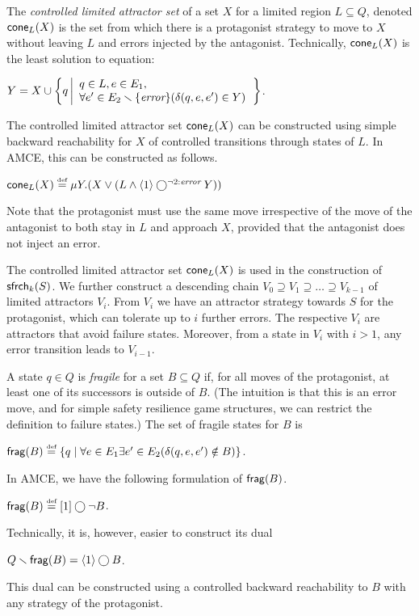 The \emph{controlled limited attractor set} of a set $X$ for a
limited region $L\subseteq Q$, denoted $\mathsf{cone}_L(X)$ is the set 
from which there is a protagonist strategy to move to $X$ without leaving $L$ 
and errors injected by the antagonist.  
Technically, $\mathsf{cone}_L(X)$ is the least solution to 
equation:\label{reply2.cla} 
\begin{center} 
$Y = X\cup\left\{q\left| \begin{array}{l} 
q\in L,e\in E_1,\\
\forall e'\in E_2\smallsetminus \{\textit{error}\}( \delta(q,e,e')\in Y)
\end{array}\right.\right\}$.   
\end{center} 
The controlled limited attractor set 
$\mathsf{cone}_L(X)$ can be constructed using simple backward reachability 
for $X$ of controlled transitions through states of $L$.  
In AMCE, this can be constructed as follows. 
\begin{center} 
\label{reply2.cla.alg}
$\mathsf{cone}_L(X)\stackrel{\mbox{\tiny def}}{=} \mu Y. (X\vee(L\wedge \langle 1\rangle \bigcirc^{\neg 2:\textit{\scriptsize error}} Y))$
\end{center} 
Note that the protagonist must use the same move irrespective 
of the move of the antagonist to both stay in $L$ and approach $X$, 
provided that the antagonist does not inject an error.




The controlled limited attractor set\label{reply2.limit.attractor} 
$\mathsf{cone}_L(X)$ is used in the construction of $\mathsf{sfrch}_k(S)$.  
We further construct a descending chain 
$V_0 \supseteq V_1 \supseteq \ldots\supseteq V_{k-1}$ of limited attractors $V_i$. 
From $V_i$ we have an attractor strategy towards $S$ for the protagonist, 
which can tolerate 
up to $i$ further errors.
The respective $V_i$ are attractors that avoid failure states.  \label{reply2.error2failure} 
Moreover, from a state in $V_i$ with $i>1$, 
any error transition leads to $V_{i-1}$.  

A state $q\in Q$ is \emph{fragile} for a set $B\subseteq Q$ 
if, for all moves of the protagonist, at least one of its successors is outside of $B$.
(The intuition is that this is an error move, and for simple safety resilience game structures, we can restrict the definition to failure states.)
The set of fragile states for $B$ is 
\begin{center} 
$\mathsf{frag}(B) \stackrel{\mbox{\tiny def}}{=} 
\{q\mid \forall e\in E_1 \exists e'\in E_2(\delta(q,e,e')\notin B)\}$.
\end{center} 
In AMCE, we have the following formulation of $\mathsf{frag}(B)$.  
\begin{center} 
$\mathsf{frag}(B)\stackrel{\mbox{\tiny def}}{=} [ 1 ] \bigcirc \neg B$.  
\end{center} 
Technically, it is, however, easier to construct its dual
\begin{center} 
\label{reply2.easier.frag.B} 
$Q \smallsetminus \mathsf{frag}(B) = \langle 1 \rangle \bigcirc B$. 
\end{center} 
This dual can be constructed using a controlled backward reachability to $B$ with 
any strategy of the protagonist.   


